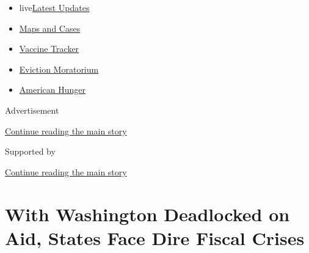 \begin{itemize}
\tightlist
\item
  live\href{https://www.nytimes3xbfgragh.onion/2020/09/09/world/covid-19-coronavirus.html?name=styln-coronavirus-markets\&region=TOP_BANNER\&block=storyline_menu_recirc\&action=click\&pgtype=Article\&impression_id=398e6171-f296-11ea-b172-61b0efec9af7\&variant=undefined}{Latest
  Updates}
\item
  \href{https://www.nytimes3xbfgragh.onion/interactive/2020/us/coronavirus-us-cases.html?name=styln-coronavirus-markets\&region=TOP_BANNER\&block=storyline_menu_recirc\&action=click\&pgtype=Article\&impression_id=398e6172-f296-11ea-b172-61b0efec9af7\&variant=undefined}{Maps
  and Cases}
\item
  \href{https://www.nytimes3xbfgragh.onion/interactive/2020/science/coronavirus-vaccine-tracker.html?name=styln-coronavirus-markets\&region=TOP_BANNER\&block=storyline_menu_recirc\&action=click\&pgtype=Article\&impression_id=398e8880-f296-11ea-b172-61b0efec9af7\&variant=undefined}{Vaccine
  Tracker}
\item
  \href{https://www.nytimes3xbfgragh.onion/2020/09/02/your-money/eviction-moratorium-covid.html?name=styln-coronavirus-markets\&region=TOP_BANNER\&block=storyline_menu_recirc\&action=click\&pgtype=Article\&impression_id=398e8881-f296-11ea-b172-61b0efec9af7\&variant=undefined}{Eviction
  Moratorium}
\item
  \href{https://www.nytimes3xbfgragh.onion/interactive/2020/09/02/magazine/food-insecurity-hunger-us.html?name=styln-coronavirus-markets\&region=TOP_BANNER\&block=storyline_menu_recirc\&action=click\&pgtype=Article\&impression_id=398e8882-f296-11ea-b172-61b0efec9af7\&variant=undefined}{American
  Hunger}
\end{itemize}

Advertisement

\protect\hyperlink{after-top}{Continue reading the main story}

Supported by

\protect\hyperlink{after-sponsor}{Continue reading the main story}

\hypertarget{with-washington-deadlocked-on-aid-states-face-dire-fiscal-crises}{%
\section{With Washington Deadlocked on Aid, States Face Dire Fiscal
Crises}\label{with-washington-deadlocked-on-aid-states-face-dire-fiscal-crises}}

